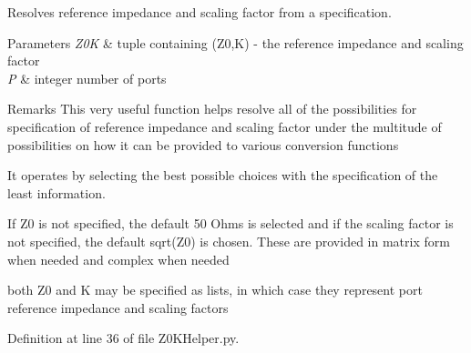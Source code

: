 Resolves reference impedance and scaling factor from a specification. 


\begin{DoxyParams}{Parameters}
{\em Z0K} & tuple containing (Z0,K) -\/ the reference impedance and scaling factor \\
\hline
{\em P} & integer number of ports \\
\hline
\end{DoxyParams}
\begin{DoxyRemark}{Remarks}
This very useful function helps resolve all of the possibilities for specification of reference impedance and scaling factor under the multitude of possibilities on how it can be provided to various conversion functions
\end{DoxyRemark}
It operates by selecting the best possible choices with the specification of the least information.

If Z0 is not specified, the default 50 Ohms is selected and if the scaling factor is not specified, the default sqrt(\+Z0) is chosen. These are provided in matrix form when needed and complex when needed

both Z0 and K may be specified as lists, in which case they represent port reference impedance and scaling factors 

Definition at line 36 of file Z0\+K\+Helper.\+py.

